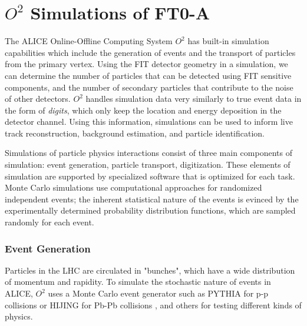 
\chapter{$O^2$ Simulations of FT0-A}
The ALICE Online-Offline Computing System $O^2$ has built-in simulation capabilities which include the generation of events and the transport of particles from the primary vertex. Using the FIT detector geometry in a simulation, we can determine the number of particles that can be detected using FIT sensitive components, and the number of secondary particles that contribute to the noise of other detectors. $O^2$ handles simulation data very similarly to true event data in the form of \textit{digits}, which only keep the location and energy deposition in the detector channel. Using this information, simulations can be used to inform live track reconstruction, background estimation, and particle identification. 



Simulations of particle physics interactions consist of three main components of simulation: event generation, particle transport, digitization. These elements of simulation are supported by specialized software that is optimized for each task. Monte Carlo simulations use computational approaches for randomized independent events; the inherent statistical nature of the events is evinced by the experimentally determined probability distribution functions, which are sampled randomly for each event. 

\subsection{Event Generation}
 Particles in the LHC are circulated in "bunches", which have a wide distribution of momentum and rapidity. To simulate the stochastic nature of events in ALICE, $O^2$ uses a Monte Carlo event generator such as PYTHIA for p-p collisions \cite{PYTHIA} or HIJING for Pb-Pb collisions \cite{HIJING}, and others for testing different kinds of physics.
 
